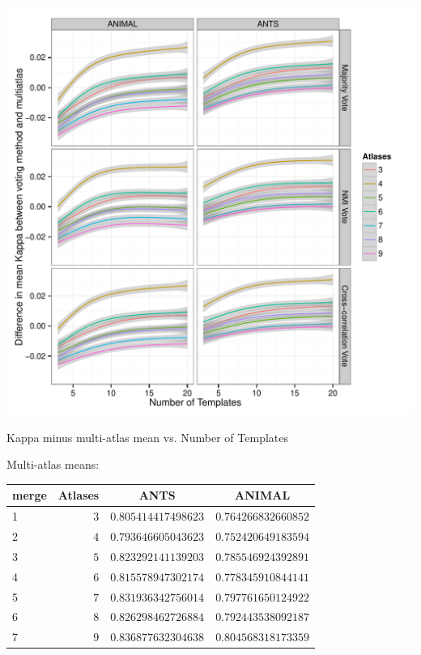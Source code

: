 \documentclass{article}\usepackage{graphicx, color}
\makeatletter
\def\maxwidth{ %
  \ifdim\Gin@nat@width>\linewidth
    \linewidth
  \else
    \Gin@nat@width
  \fi
}
\newenvironment{knitrout}{}{} %
\makeatother
\begin{document}
\begin{knitrout}
\color{fgcolor}

{\centering \includegraphics[width=\maxwidth]{figure/a2a_facet_mameans} 

}


\end{knitrout}



Kappa minus multi-atlas mean vs. Number of Templates

Multi-atlas means:


%
\begin{table}[!tbp]
\begin{center}
\begin{tabular}{lrrr}
\hline\hline
\multicolumn{1}{l}{merge}&\multicolumn{1}{c}{Atlases}&\multicolumn{1}{c}{ANTS}&\multicolumn{1}{c}{ANIMAL}\tabularnewline
\hline
1&$3$&$0.805414417498623$&$0.764266832660852$\tabularnewline
2&$4$&$0.793646605043623$&$0.752420649183594$\tabularnewline
3&$5$&$0.823292141139203$&$0.785546924392891$\tabularnewline
4&$6$&$0.815578947302174$&$0.778345910844141$\tabularnewline
5&$7$&$0.831936342756014$&$0.797761650124922$\tabularnewline
6&$8$&$0.826298462726884$&$0.792443538092187$\tabularnewline
7&$9$&$0.836877632304638$&$0.804568318173359$\tabularnewline
\hline
\end{tabular}
\end{center}
\end{table}
\end{document}
